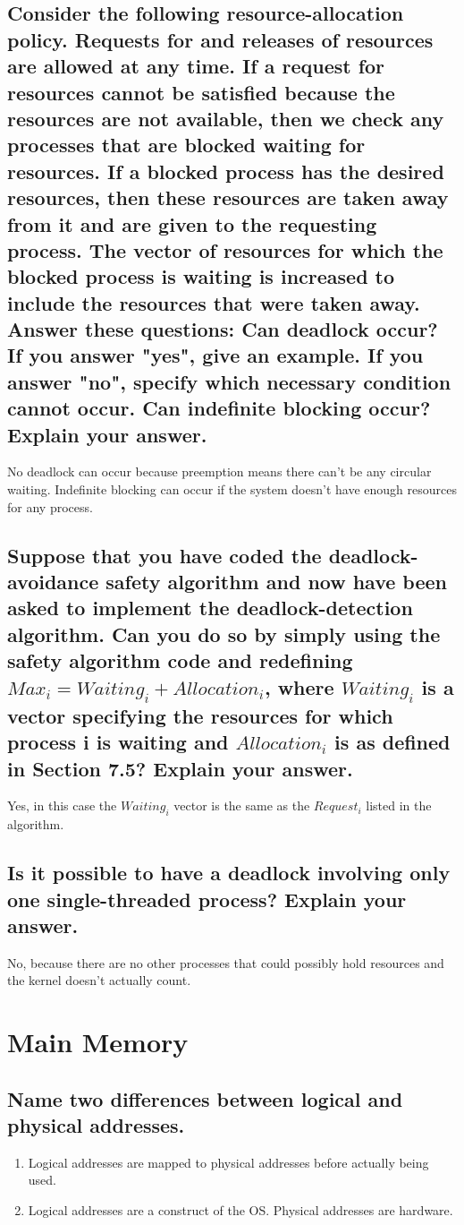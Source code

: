 \documentclass{book}%
\begin{document}
\section{Consider the following resource-allocation policy. Requests for and
releases of resources are allowed at any time. If a request for resources cannot
be satisfied because the resources are not available, then we check any 
processes that are blocked waiting for resources. If a blocked process has the
desired resources, then these resources are taken away from it and are given to
the requesting process. The vector of resources for which the blocked process is
waiting is increased to include the resources that were taken away. Answer these
questions: Can deadlock occur? If you answer "yes", give an example. If you
answer "no", specify which necessary condition cannot occur. Can indefinite
blocking occur? Explain your answer.}
No deadlock can occur because preemption means there can't be any circular
waiting. Indefinite blocking can occur if the system doesn't have enough
resources for any process. 
\section{Suppose that you have coded the deadlock-avoidance safety algorithm
and now have been asked to implement the deadlock-detection algorithm. Can you
do so by simply using the safety algorithm code and redefining
$ Max_i = Waiting_i + Allocation_i$, where $Waiting_i$ is a vector specifying
the resources for which process i is waiting and $Allocation_i$ is as defined
in Section 7.5? Explain your answer.}
Yes, in this case the $Waiting_i$ vector is the same as the $Request_i$ listed
in the algorithm.
\section{Is it possible to have a deadlock involving only one single-threaded
process? Explain your answer.}
No, because there are no other processes that could possibly hold resources and
the kernel doesn't actually count.
\chapter{Main Memory}
\section{Name two differences between logical and physical addresses.}
\begin{enumerate}
\item Logical addresses are mapped to physical addresses before actually being
used.
\item Logical addresses are a construct of the OS. Physical addresses are
hardware.
\end{enumerate}
\end{document}
